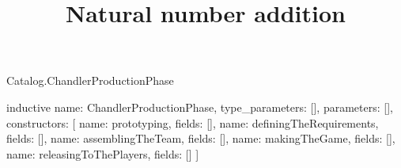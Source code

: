 \begin{lexlean}{Catalog.ChandlerProductionPhase}
\title{Natural number addition}
\begin{semanticmodule}
inductive{
  name: ChandlerProductionPhase,
  type_parameters: [],
  parameters: [],
  constructors: [
    {name: prototyping, fields: []},
    {name: definingTheRequirements, fields: []},
    {name: assemblingTheTeam, fields: []},
    {name: makingTheGame, fields: []},
    {name: releasingToThePlayers, fields: []}
  ]
}
\end{semanticmodule}
\end{lexlean}
